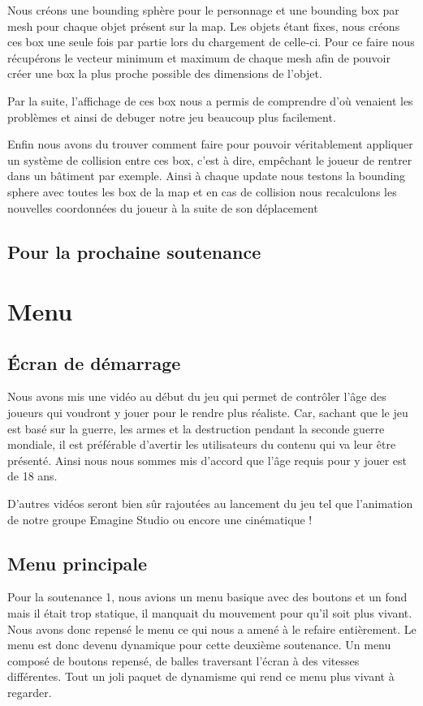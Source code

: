 \documentclass[11pt]{report}
\begin{document}
Nous créons une bounding sphère pour le personnage et une bounding box par mesh pour chaque objet présent sur la map. Les objets étant fixes, nous créons ces box une seule fois par partie lors du chargement de celle-ci. Pour ce faire nous récupérons le vecteur minimum et maximum de chaque mesh afin de pouvoir créer une box la plus proche possible des dimensions de l'objet.

Par la suite, l'affichage de ces box nous a permis de comprendre d’où venaient les problèmes et ainsi de debuger notre jeu beaucoup plus facilement.

Enfin nous avons du trouver comment faire pour pouvoir véritablement appliquer un système de collision entre ces box, c'est à dire, empêchant le joueur de rentrer dans un bâtiment par exemple.
Ainsi à chaque update nous testons la bounding sphere avec toutes les box de la map et en cas de collision nous recalculons les nouvelles coordonnées du joueur à la suite de son déplacement

\subsection{Pour la prochaine soutenance}

\newpage
\section{Menu}

\subsection{Écran de démarrage}

Nous avons mis une vidéo au début du jeu qui permet de contrôler l’âge des joueurs qui voudront y jouer pour le rendre plus réaliste. Car, sachant que le jeu est basé sur la guerre, les armes et la destruction pendant la seconde guerre mondiale,  il est préférable d’avertir les utilisateurs du contenu qui va leur être présenté. Ainsi  nous nous sommes mis d’accord que l’âge requis pour y jouer est de 18 ans.

D’autres vidéos seront bien sûr rajoutées au lancement du jeu tel que l’animation de notre groupe Emagine Studio ou encore une cinématique !

\subsection{Menu principale}

Pour la soutenance 1, nous avions un menu basique avec des boutons et un fond mais il était trop statique, il manquait du mouvement pour qu’il soit plus vivant. Nous avons donc repensé le menu ce qui nous a amené à le refaire entièrement. Le menu est donc devenu dynamique pour cette deuxième soutenance. Un menu composé de boutons repensé, de balles traversant l’écran à des vitesses différentes. Tout un joli paquet de dynamisme qui rend ce menu plus vivant à regarder.
\end{document}
